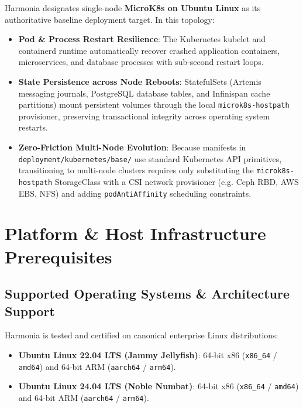 Harmonia designates single-node \textbf{MicroK8s on Ubuntu Linux} as its authoritative baseline deployment target. In this topology:
\begin{itemize}
    \item \textbf{Pod \& Process Restart Resilience}: The Kubernetes kubelet and containerd runtime automatically recover crashed application containers, microservices, and database processes with sub-second restart loops.
    \item \textbf{State Persistence across Node Reboots}: StatefulSets (Artemis messaging journals, PostgreSQL database tables, and Infinispan cache partitions) mount persistent volumes through the local \texttt{microk8s-hostpath} provisioner, preserving transactional integrity across operating system restarts.
    \item \textbf{Zero-Friction Multi-Node Evolution}: Because manifests in \texttt{deployment/kubernetes/base/} use standard Kubernetes API primitives, transitioning to multi-node clusters requires only substituting the \texttt{microk8s-hostpath} StorageClass with a CSI network provisioner (e.g. Ceph RBD, AWS EBS, NFS) and adding \texttt{podAntiAffinity} scheduling constraints.
\end{itemize}

\section{Platform \& Host Infrastructure Prerequisites}
\label{sec:host_prerequisites}

\subsection{Supported Operating Systems \& Architecture Support}

Harmonia is tested and certified on canonical enterprise Linux distributions:
\begin{itemize}
    \item \textbf{Ubuntu Linux 22.04 LTS (Jammy Jellyfish)}: 64-bit x86 (\texttt{x86\_64} / \texttt{amd64}) and 64-bit ARM (\texttt{aarch64} / \texttt{arm64}).
    \item \textbf{Ubuntu Linux 24.04 LTS (Noble Numbat)}: 64-bit x86 (\texttt{x86\_64} / \texttt{amd64}) and 64-bit ARM (\texttt{aarch64} / \texttt{arm64}).
\end{itemize}


